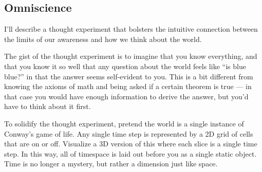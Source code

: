 \documentclass[11pt, oneside]{article}   	%
\begin{document}
%

\subsection{Omniscience}


I'll describe a thought experiment that bolsters the intuitive connection
between the limits of our awareness and how we think about the world.

The gist of the thought experiment is to imagine that you know everything,
and that you know it so well that any question about the world feels like ``is
blue blue?'' in that the answer seems self-evident to you. This is a bit
different from knowing the axioms of math and being asked if a certain theorem
is true --- in that case you would have enough information to derive the answer,
but you'd have to think about it first.

To solidify the thought experiment, pretend the world is a single instance of
Conway's game of life. Any single time step is represented by a 2D grid of cells
that are on or off.
Visualize a 3D version of this where each slice is a single time step. In this
way, all of timespace is laid out before you as a single static object. Time is
no longer a mystery, but rather a dimension just like space.
\end{document}
